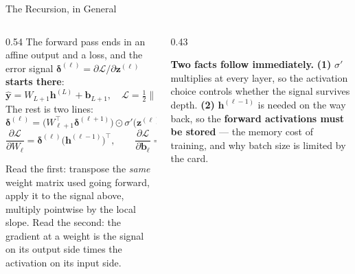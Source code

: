 \begin{frame}{The Recursion, in General}
\begin{columns}[T]
\begin{column}{0.54\textwidth}
\small
The forward pass ends in an affine output and a loss, and the error signal $\boldsymbol\delta^{(\ell)}=\partial\mathcal{L}/\partial\mathbf{z}^{(\ell)}$ \textbf{starts there}:
\[
  \hat{\mathbf y}=W_{L+1}\mathbf{h}^{(L)}+\mathbf{b}_{L+1},\quad
  \mathcal{L}=\tfrac12\lVert\hat{\mathbf y}-\mathbf y\rVert^{2},\quad
  \boldsymbol\delta^{(L+1)}=\hat{\mathbf y}-\mathbf y .
\]
The rest is two lines:
\[
  \boldsymbol\delta^{(\ell)}=\bigl(W_{\ell+1}^{\top}\boldsymbol\delta^{(\ell+1)}\bigr)\odot\sigma'\bigl(\mathbf{z}^{(\ell)}\bigr),
\]
\[
  \frac{\partial\mathcal{L}}{\partial W_\ell}=\boldsymbol\delta^{(\ell)}\bigl(\mathbf{h}^{(\ell-1)}\bigr)^{\top},
  \qquad
  \frac{\partial\mathcal{L}}{\partial\mathbf{b}_\ell}=\boldsymbol\delta^{(\ell)} .
\]
\medskip

Read the first: transpose the \emph{same} weight matrix used going forward, apply it to the signal above, multiply pointwise by the local slope. Read the second: the gradient at a weight is the signal on its output side times the activation on its input side.
\end{column}
\begin{column}{0.43\textwidth}
\begin{takeawaybox}\small
\textbf{Two facts follow immediately.}
\medskip
\textbf{(1)} $\sigma'$ multiplies at every layer, so the activation choice controls whether the signal survives depth.
\medskip
\textbf{(2)} $\mathbf{h}^{(\ell-1)}$ is needed on the way back, so the \textbf{forward activations must be stored} --- the memory cost of training, and why batch size is limited by the card.
\end{takeawaybox}
\end{column}
\end{columns}
\vspace{1mm}
\end{frame}

